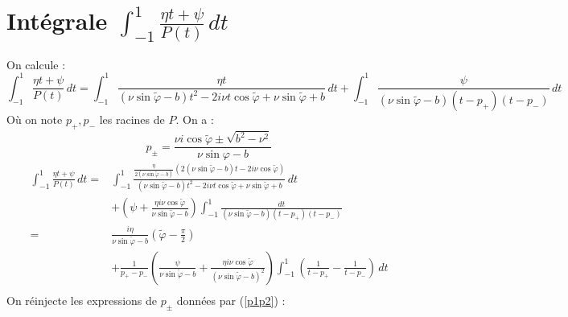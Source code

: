 \section{Intégrale $\int_{-1}^1 \frac{\eta t+ \psi}{P(t)}\, dt$}
\label{calculintP}
On calcule :
\begin{equation*}
\int_{-1}^1 \frac{\eta t+ \psi}{P(t)}\, dt = \int_{-1}^1 \frac{\eta t}{(\nu\sin\tilde{\varphi}-b)t^2-2i\nu t\cos\tilde{\varphi}+\nu\sin\tilde{\varphi}+b}\,dt +\int_{-1}^1 \frac{\psi}{(\nu\sin\tilde{\varphi}-b)(t-p_+)(t-p_-)}\, dt
\end{equation*}
Où on note $p_+,p_-$ les racines de $P$. On a :
\begin{equation}
p_\pm=\frac{\nu i \cos\tilde{\varphi}\pm \sqrt{b^2-\nu^2}}{\nu\sin\varphi-b}
\label{p1p2}
\end{equation}
\begin{equation*}
\begin{split}
\int_{-1}^1 \frac{\eta t+ \psi}{P(t)}\, dt =& \int_{-1}^1 \frac{\frac{\eta}{2(\nu\sin\tilde{\varphi}-b)}(2(\nu\sin\tilde{\varphi}-b)t-2i\nu\cos\tilde{\varphi})}{(\nu\sin\tilde{\varphi}-b)t^2-2i\nu t\cos\tilde{\varphi}+\nu\sin\tilde{\varphi}+b}\,dt\\
&+(\psi+\frac{\eta i\nu\cos\tilde{\varphi}}{\nu\sin\tilde{\varphi}-b})\int_{-1}^1 \frac{dt}{(\nu\sin\tilde{\varphi}-b)(t-p_+)(t-p_-)}\\
=&\frac{i\eta}{\nu\sin\tilde{\varphi}-b}(\tilde{\varphi}-\frac{\pi}{2})\\
&+\frac{1}{p_+-p_-}\left(\frac{\psi}{\nu\sin\tilde{\varphi}-b}+\frac{\eta i\nu\cos\tilde{\varphi}}{(\nu\sin\tilde{\varphi}-b)^2}\right)\int_{-1}^1 \left(\frac{1}{t-p_+}-\frac{1}{t-p_-}\right)\,dt\\
\end{split}
\end{equation*}
On réinjecte les expressions de $p_\pm$ données par (\ref{p1p2}) :

